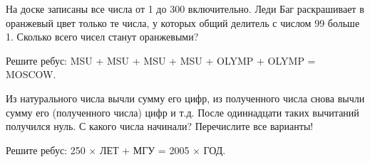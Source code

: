  На доске записаны все числа от 1 до 300 включительно. Леди Баг раскрашивает в оранжевый цвет только те числа, у которых общий делитель с числом 99 больше 1.
Сколько всего чисел станут оранжевыми?


Решите ребус: MSU + MSU + MSU + MSU + OLYMP + OLYMP = MOSCOW.


 Из натурального числа вычли сумму его цифр, из
полученного числа снова вычли сумму его (полученного числа) цифр и т.д. После одиннадцати
таких вычитаний получился нуль. С какого числа начинали? Перечислите все варианты!




Решите ребус: 250 $\times$ ЛЕТ + МГУ = 2005 $\times$ ГОД.

